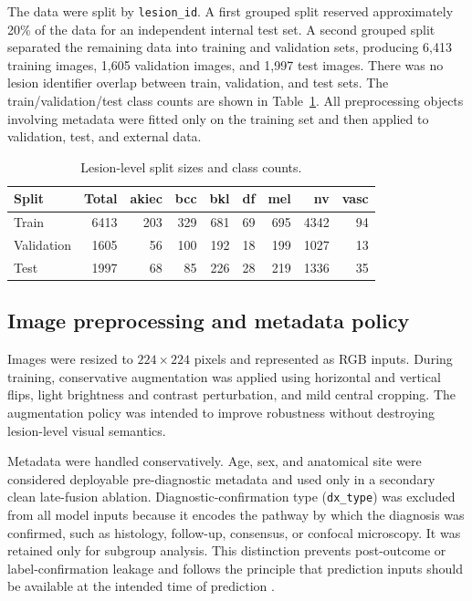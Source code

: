 \documentclass[11pt,a4paper]{article}
\begin{document}
The data were split by \texttt{lesion\_id}. A first grouped split reserved approximately 20\% of the data for an independent internal test set. A second grouped split separated the remaining data into training and validation sets, producing 6,413 training images, 1,605 validation images, and 1,997 test images. There was no lesion identifier overlap between train, validation, and test sets. The train/validation/test class counts are shown in Table~\ref{tab:splits}. All preprocessing objects involving metadata were fitted only on the training set and then applied to validation, test, and external data.

\begin{table}[H]
\centering
\caption{Lesion-level split sizes and class counts.}
\label{tab:splits}
\begin{tabular}{lrrrrrrrr}
\toprule
Split & Total & akiec & bcc & bkl & df & mel & nv & vasc \\
\midrule
Train & 6413 & 203 & 329 & 681 & 69 & 695 & 4342 & 94 \\
Validation & 1605 & 56 & 100 & 192 & 18 & 199 & 1027 & 13 \\
Test & 1997 & 68 & 85 & 226 & 28 & 219 & 1336 & 35 \\
\bottomrule
\end{tabular}
\end{table}

\subsection{Image preprocessing and metadata policy}

Images were resized to $224\times224$ pixels and represented as RGB inputs. During training, conservative augmentation was applied using horizontal and vertical flips, light brightness and contrast perturbation, and mild central cropping. The augmentation policy was intended to improve robustness without destroying lesion-level visual semantics.

Metadata were handled conservatively. Age, sex, and anatomical site were considered deployable pre-diagnostic metadata and used only in a secondary clean late-fusion ablation. Diagnostic-confirmation type (\texttt{dx\_type}) was excluded from all model inputs because it encodes the pathway by which the diagnosis was confirmed, such as histology, follow-up, consensus, or confocal microscopy. It was retained only for subgroup analysis. This distinction prevents post-outcome or label-confirmation leakage and follows the principle that prediction inputs should be available at the intended time of prediction \citep{collins2024tripodai,hohn2021metadata}.
\end{document}
